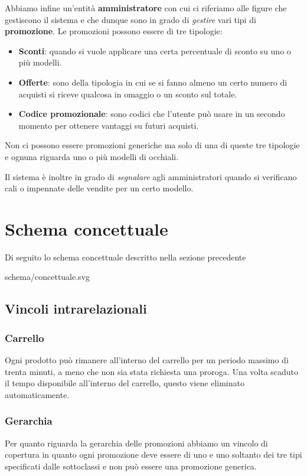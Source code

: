 \documentclass[12pt, a4paper]{article}
\begin{document}
Abbiamo infine un'entità \textbf{amministratore} con cui ci riferiamo alle figure che gestiscono
il sistema e che dunque sono in grado di \emph{gestire} vari tipi di \textbf{promozione}. Le
promozioni possono essere di tre tipologie:
\begin{itemize}
	\item \textbf{Sconti}: quando si vuole applicare una certa percentuale di sconto su uno o più
	      modelli.
	\item \textbf{Offerte}: sono della tipologia in cui se si fanno almeno un certo numero di
	      acquisti si riceve qualcosa in omaggio o un sconto sul totale.
	\item \textbf{Codice promozionale}: sono codici che l'utente può usare in un secondo momento
	      per ottenere vantaggi su futuri acquisti.
\end{itemize}
Non ci possono essere promozioni generiche ma solo di una di queste tre tipologie e ognuna riguarda
uno o più modelli di occhiali.

Il sistema è inoltre in grado di \emph{segnalare} agli amministratori quando si verificano cali o
impennate delle vendite per un certo modello.

\section{Schema concettuale}
Di seguito lo schema concettuale descritto nella sezione precedente

 {schema/concettuale.svg}

\subsection{Vincoli intrarelazionali}

\subsubsection{Carrello}
Ogni prodotto può rimanere all'interno del carrello per un periodo massimo di trenta minuti, a
meno che non sia stata richiesta una proroga. Una volta scaduto il tempo disponibile all'interno
del carrello, questo viene eliminato automaticamente.

\subsubsection{Gerarchia}
Per quanto riguarda la gerarchia delle promozioni abbiamo un vincolo di copertura in quanto ogni
promozione deve essere di uno e uno soltanto dei tre tipi specificati dalle sottoclassi e non può
essere una promozione generica.
\end{document}
